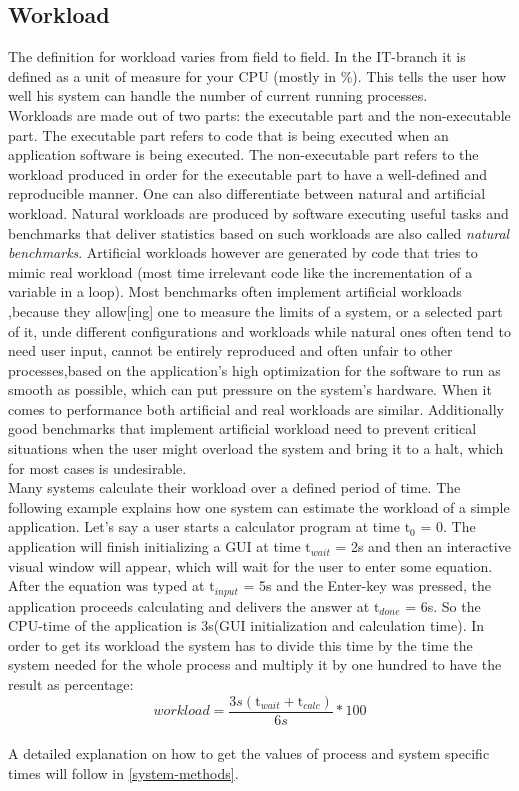 \subsection{Workload}
The definition for workload varies from field to field. In the IT-branch it is defined as a unit of measure for your CPU (mostly in \%). This tells the user how well his system can handle the number of current running processes.\\
Workloads are made out of two parts: the executable part and the non-executable part. The executable part refers to code that is being executed when an application software is being executed. The non-executable part refers to the workload produced in order for the executable part to have \dq a well-defined and reproducible manner\dq{}. One can also differentiate between natural and artificial workload. Natural workloads are produced by software executing useful tasks and benchmarks that deliver statistics based on such workloads are also called \textit{natural benchmarks}. Artificial workloads however are generated by code that tries to mimic real workload (most time irrelevant code like the incrementation of a variable in a loop). Most benchmarks often implement artificial workloads ,because they \dq allow[ing] one to measure the limits of a system, or a selected part of it, unde different configurations and workloads\dq{} while natural ones often tend to need user input, cannot be entirely reproduced and often unfair to other processes,based on the application's high optimization for the software to run as smooth as possible, which can put pressure on the system's hardware\cite{Kounev2020}. When it comes to performance both artificial and real workloads are similar. Additionally good benchmarks that implement artificial workload need to prevent critical situations when the user might overload the system and bring it to a halt, which for most cases is undesirable.\\
Many systems calculate their workload over a defined period of time. The following example explains how one system can estimate the workload of a simple application. Let's say a user starts a calculator program at time $\mathrm{t}_0$ = 0. The application will finish initializing a GUI at time $\mathrm{t}_{wait}$ = 2s and then an interactive visual window will appear, which will wait for the user to enter some equation.
After the equation was typed at $\mathrm{t}_{input}$ = 5s and the \dq Enter\dq{}-key was pressed, the application proceeds calculating and delivers the answer at $\mathrm{t}_{done}$ = 6s. So the CPU-time of the application is 3s(GUI initialization and calculation time). In order to get its workload the system has to divide this time by the time the system needed for the whole process and multiply it by one hundred to have the result as percentage:\\
\begin{equation}
workload =  \frac{3s(\mathrm{t}_{wait}+\mathrm{t}_{calc})}{6s}*100
\end{equation}\\
A detailed explanation on how to get the values of process and system specific times will follow in \ref{system-methods}.
